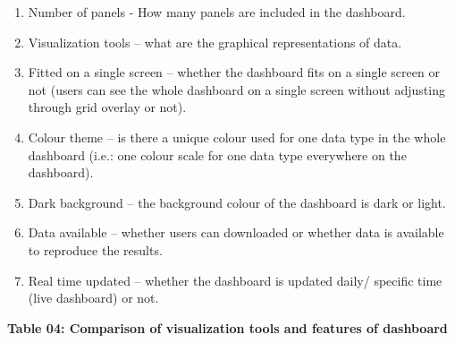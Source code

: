 \documentclass[
]{article}
\providecommand{\tightlist}{%
  \setlength{\itemsep}{0pt}\setlength{\parskip}{0pt}}
\begin{document}
\begin{enumerate}
\def\labelenumi{\roman{enumi}.}
\tightlist
\item
  Number of panels - How many panels are included in the dashboard.
\item
  Visualization tools -- what are the graphical representations of data.
\item
  Fitted on a single screen -- whether the dashboard fits on a single
  screen or not (users can see the whole dashboard on a single screen
  without adjusting through grid overlay or not).
\item
  Colour theme -- is there a unique colour used for one data type in the
  whole dashboard (i.e.: one colour scale for one data type everywhere
  on the dashboard).
\item
  Dark background -- the background colour of the dashboard is dark or
  light.
\item
  Data available -- whether users can downloaded or whether data is
  available to reproduce the results.
\item
  Real time updated -- whether the dashboard is updated daily/ specific
  time (live dashboard) or not.
\end{enumerate}

\textbf{Table 04: Comparison of visualization tools and features of
dashboard}
\end{document}
